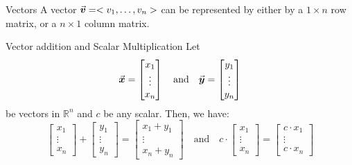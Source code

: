\documentclass{beamer}
\begin{document}
\begin{frame}
\begin{block}{Vectors}
A vector ${\vec{\boldsymbol{v}}}=< v_1,\dots,v_n >$ can be represented by either by a $1\times n$ row matrix, or a $n\times 1$ column matrix.
\end{block}\pause
\begin{block}{Vector addition and Scalar Multiplication}
Let
\[
{\vec{\boldsymbol{x}}}=\begin{bmatrix}x_1\\\vdots\\x_n\end{bmatrix}
\quad\text{and}\quad
{\vec{\boldsymbol{y}}}=\begin{bmatrix}y_1\\\vdots\\y_n\end{bmatrix}
\]
be vectors in  $\mathbb{R}^n$ and $c$ be any scalar. Then, we have:
\[
\begin{bmatrix}x_1\\\vdots\\x_n\end{bmatrix}+
\begin{bmatrix}y_1\\\vdots\\y_n\end{bmatrix}=
\begin{bmatrix}x_1+y_1\\\vdots\\x_n+y_n\end{bmatrix}
\quad\text{and}\quad
c\cdot\begin{bmatrix}x_1\\\vdots\\x_n\end{bmatrix}=
\begin{bmatrix} c\cdot x_1\\\vdots\\ c\cdot x_n\end{bmatrix}
\]
\end{block}
\end{frame}
\end{document}
